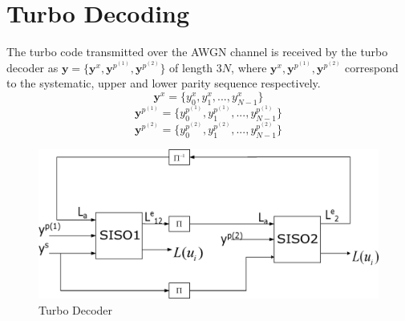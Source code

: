 \documentclass[a4paper, 12pt, oneside, openary]{jbook}
\begin{document}
\section{Turbo Decoding}
 The turbo code transmitted over the AWGN channel is received by the turbo decoder as
  $\mathbf{y}=\{\mathbf{y}^x,\mathbf{y}^{p^{(1)}},\mathbf{y}^{p^{(2)}}\}$ 
  of length $3N$, where $\mathbf{y}^x,\mathbf{y}^{p^{(1)}},\mathbf{y}^{p^{(2)}}$
    correspond to the systematic, upper and lower parity sequence respectively.
    $$\mathbf{y}^x=\{y^x_0, y^x_1,...,y^x_{N-1}\}$$ 
    $$\mathbf{y}^{p^{(1)}}=\{y^{p^{(1)}}_0, y^{p^{(1)}}_1,...,y^{p^{(1)}}_{N-1} \}$$
 $$\mathbf{y}^{p^{(2)}}=\{y^{p^{(2)}}_0, y^{p^{(2)}}_1,...,y^{p^{(2)}}_{N-1}\}$$
\begin{figure}[h!]
\centering
		\includegraphics[width=\textwidth]{D1.eps}
		\caption{Turbo Decoder}
		\label{TDC}
		\end{figure}
	
\end{document}
